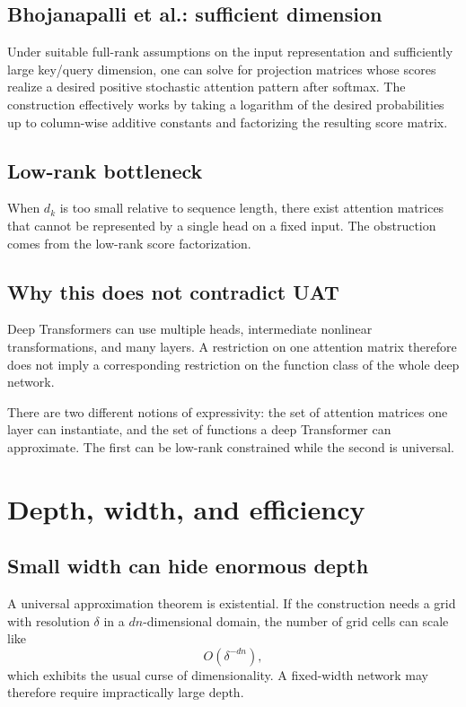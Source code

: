 \documentclass[11pt,a4paper,oneside,openany]{memoir}
\theoremstyle{definition}
\begin{document}
\section{Bhojanapalli et al.: sufficient dimension}
Under suitable full-rank assumptions on the input representation and sufficiently large key/query dimension, one can solve for projection matrices whose scores realize a desired positive stochastic attention pattern after softmax.  The construction effectively works by taking a logarithm of the desired probabilities up to column-wise additive constants and factorizing the resulting score matrix.

\section{Low-rank bottleneck}
When $d_k$ is too small relative to sequence length, there exist attention matrices that cannot be represented by a single head on a fixed input.  The obstruction comes from the low-rank score factorization.

\section{Why this does not contradict UAT}
Deep Transformers can use multiple heads, intermediate nonlinear transformations, and many layers.  A restriction on one attention matrix therefore does not imply a corresponding restriction on the function class of the whole deep network.

\begin{presentbox}
There are two different notions of expressivity: the set of attention matrices one layer can instantiate, and the set of functions a deep Transformer can approximate.  The first can be low-rank constrained while the second is universal.
\end{presentbox}

\chapter{Depth, width, and efficiency}
\section{Small width can hide enormous depth}
A universal approximation theorem is existential.  If the construction needs a grid with resolution $\delta$ in a $dn$-dimensional domain, the number of grid cells can scale like
\[
O(\delta^{-dn}),
\]
which exhibits the usual curse of dimensionality.  A fixed-width network may therefore require impractically large depth.
\end{document}
